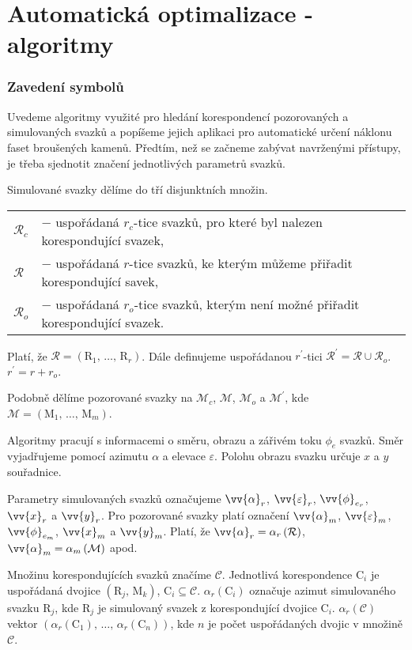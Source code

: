 \part{Automatická optimalizace - algoritmy}

\section{Zavedení symbolů}
	Uvedeme algoritmy využité pro hledání korespondencí pozorovaných a simulovaných svaz\-ků a popíšeme jejich aplikaci pro automatické určení náklonu faset broušených kamenů. 
	Předtím, než se začneme zabývat navrženými přístupy, je třeba sjednotit značení jednotlivých parametrů svazků. 
	
	Simulované svazky dělíme do tří disjunktních množin. 
	
	\begin{tabular}{l l}
	$\mathcal{R}_c$ & $-$ uspořádaná $r_c$-tice svazků, pro které byl nalezen korespondující svazek,\\
	$\mathcal{R}$   & $-$ uspořádaná $r$-tice svazků, ke kterým můžeme přiřadit korespondující savek, \\
	$\mathcal{R}_o$ & $-$ uspořádaná $r_o$-tice svazků, kterým není možné přiřadit korespondující svazek.  \\
	\end{tabular}	

Platí, že $\mathcal{R} = \left(\mathrm{R}_1 ,\,\dots,\, \mathrm{R}_r\right)$. Dále definujeme uspořádanou $r^\prime$-tici $\mathcal{R}^\prime = \mathcal{R} \cup \mathcal{R}_o$. $r^\prime = r +r_o $.
	
	Podobně dělíme pozorované svazky na $\mathcal{M}_c$, $\mathcal{M}$, $\mathcal{M}_o$ a $ \mathcal{M}^\prime$, kde $\mathcal{M} = \left(\mathrm{M}_1 ,\,\dots,\, \mathrm{M}_m\right)$.
	 
	 Algoritmy pracují s informacemi o směru, obrazu a zářivém toku $\phi_e$ svazků. Směr vyjadřujeme pomocí azimutu $\alpha$ a elevace $\varepsilon$. Polohu obrazu svazku určuje $x$ a $y$ souřadnice.
	
	 Parametry simulovaných svazků označujeme $\vv{\alpha}_{r}$, $\vv{\varepsilon}_{r}$, $\vv{\phi}_{e_{r}}$, $\vv{x}_r$  a $\vv{y}_r$. Pro pozorované svazky platí označení $\vv{\alpha}_{m}$, $\vv{\varepsilon}_{m}$, $\vv{\phi}_{e_{m}}$, $\vv{x}_m$  a $\vv{y}_m$. Platí, že $\vv{\alpha}_{r} = \alpha_{r}\left(\mathcal{R}\right)$, $\vv{\alpha}_{m} = \alpha_{m}\left(\mathcal{M}\right)$ apod. 

Množinu korespondujících svazků značíme $\mathcal{C}$. Jednotlivá korespondence $\mathrm{C}_i$ je uspořádaná dvojice $\left(\mathrm{R}_j,\,\mathrm{M}_k \right)$, $\mathrm{C}_i \subseteq \mathcal{C}$. $\alpha_{r}(\mathrm{C}_i)$ označuje azimut simulovaného  svazku $\mathrm{R}_j$, kde $\mathrm{R}_j$ je simulovaný svazek z korespondující dvojice $\mathrm{C}_i$. $\alpha_{r}(\mathcal{C})$ vektor $\left(\alpha_{r}(\mathrm{C}_1),\,\dots,\,\alpha_{r}(\mathrm{C}_n)\right)$, kde $n$ je počet uspořádaných dvojic v množině $\mathcal{C}$.
	

